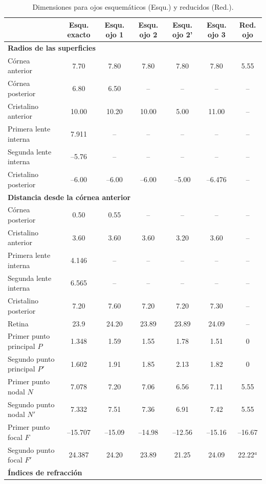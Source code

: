 \documentclass[12pt]{book}
\begin{document}
\begin{table}[htbp]
\centering
\caption{Dimensiones para ojos esquemáticos (Esqu.) y reducidos (Red.).}
\label{tab:111}
\footnotesize
\begin{tabularx}{\textwidth}{Xcccccc}
\toprule
 & Esqu. exacto & Esqu. ojo 1 & Esqu. ojo 2 & Esqu. ojo 2' & Esqu. ojo 3 & Red. ojo \\
\midrule
\multicolumn{7}{l}{\textbf{Radios de las superficies}} \\
Córnea anterior & 7.70 & 7.80 & 7.80 & 7.80 & 7.80 & 5.55 \\
Córnea posterior & 6.80 & 6.50 & -- & -- & -- & -- \\
Cristalino anterior & 10.00 & 10.20 & 10.00 & 5.00 & 11.00 & -- \\
Primera lente interna & 7.911 & -- & -- & -- & -- & -- \\
Segunda lente interna & --5.76 & -- & -- & -- & -- & -- \\
Cristalino posterior & --6.00 & --6.00 & --6.00 & --5.00 & --6.476 & -- \\
\midrule
\multicolumn{7}{l}{\textbf{Distancia desde la córnea anterior}} \\
Córnea posterior & 0.50 & 0.55 & -- & -- & -- & -- \\
Cristalino anterior & 3.60 & 3.60 & 3.60 & 3.20 & 3.60 & -- \\
Primera lente interna & 4.146 & -- & -- & -- & -- & -- \\
Segunda lente interna & 6.565 & -- & -- & -- & -- & -- \\
Cristalino posterior & 7.20 & 7.60 & 7.20 & 7.20 & 7.30 & -- \\
Retina & 23.9 & 24.20 & 23.89 & 23.89 & 24.09 & -- \\
Primer punto principal $P$ & 1.348 & 1.59 & 1.55 & 1.78 & 1.51 & 0 \\
Segundo punto principal $P'$ & 1.602 & 1.91 & 1.85 & 2.13 & 1.82 & 0 \\
Primer punto nodal $N$ & 7.078 & 7.20 & 7.06 & 6.56 & 7.11 & 5.55 \\
Segundo punto nodal $N'$ & 7.332 & 7.51 & 7.36 & 6.91 & 7.42 & 5.55 \\
Primer punto focal $F$ & --15.707 & --15.09 & --14.98 & --12.56 & --15.16 & --16.67 \\
Segundo punto focal $F'$ & 24.387 & 24.20 & 23.89 & 21.25 & 24.09 & 22.22$^a$ \\
\midrule
\multicolumn{7}{l}{\textbf{Índices de refracción}} \\

\end{tabularx}
\end{table}
\end{document}
